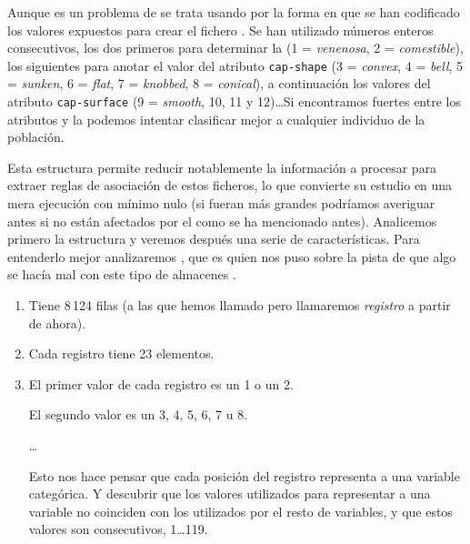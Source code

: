 Aunque es un problema de \Clasificacion se trata usando \arm por la forma en que se han codificado los valores expuestos para crear el fichero \mushroom. Se han utilizado números enteros consecutivos, los dos primeros para determinar la \clase (1 = \emph{venenosa}, 2 = \emph{comestible}), los siguientes para anotar el valor del atributo \texttt{cap-shape} (3 = \emph{convex}, 4 = \emph{bell}, 5 = \emph{sunken}, 6 = \emph{flat}, 7 = \emph{knobbed}, 8 = \emph{conical}), a continuación los valores del atributo \texttt{cap-surface} (9 = \emph{smooth}, 10, 11 y 12)\ldots Si encontramos \ARs fuertes entre los atributos y la \clase podemos intentar clasificar mejor a cualquier individuo de la población.







Esta estructura permite reducir notablemente la información a procesar para extraer reglas de asociación de estos ficheros, lo que convierte su estudio en una mera ejecución con \soporte mínimo nulo (si fueran más grandes podríamos averiguar antes si no están afectados por el \dilemaIR como se ha mencionado antes). Analicemos primero la estructura y veremos después una serie de características. Para entenderlo mejor analizaremos \mushroom, que es quien nos puso sobre la pista de que algo se hacía mal con este tipo de almacenes \D.

\begin{enumerate}
	\item Tiene 8\,124 filas (a las que hemos llamado \transacciones pero llamaremos \emph{registro} a partir de ahora).
	\item Cada registro tiene 23 elementos.
   \item El primer valor de cada registro es un 1 o un 2.
         
         El segundo valor es un 3, 4, 5, 6, 7 u 8.
         
         \ldots
         
         Esto nos hace pensar que cada posición del registro representa a una variable categórica. Y descubrir que los valores utilizados para representar a una variable no coinciden con los utilizados por el resto de variables, y que estos valores son consecutivos, 1\ldots119.
\end{enumerate}

